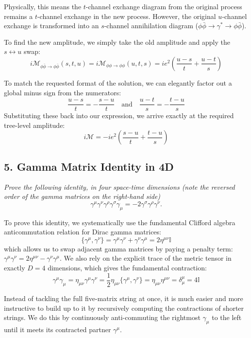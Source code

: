 Physically, this means the $t$-channel exchange diagram from the original process remains a $t$-channel exchange in the new process. However, the original $u$-channel exchange is transformed into an $s$-channel annihilation diagram ($\phi \bar{\phi} \to \gamma^* \to \phi \bar{\phi}$).

To find the new amplitude, we simply take the old amplitude and apply the $s \leftrightarrow u$ swap:
\[
    i\mathcal{M}_{\phi\bar{\phi} \to \phi\bar{\phi}}(s, t, u) = i\mathcal{M}_{\phi\phi \to \phi\phi}(u, t, s) = ie^2 \left( \frac{u - s}{t} + \frac{u - t}{s} \right)
\]

To match the requested format of the solution, we can elegantly factor out a global minus sign from the numerators:
\[
    \frac{u - s}{t} = -\frac{s - u}{t} \quad \text{and} \quad \frac{u - t}{s} = -\frac{t - u}{s}
\]
Substituting these back into our expression, we arrive exactly at the required tree-level amplitude:
\[
    i\mathcal{M} = -ie^2 \left( \frac{s - u}{t} + \frac{t - u}{s} \right)
\]


\subsection*{5. Gamma Matrix Identity in 4D}

\begin{center}
    \textit{Prove the following identity, in four space-time dimensions (note the reversed order of the gamma matrices on the right-hand side)}
    \[
        \gamma^\mu \gamma^\nu \gamma^\rho \gamma^\sigma \gamma_\mu = -2 \gamma^\sigma \gamma^\rho \gamma^\nu.
    \]
\end{center}

To prove this identity, we systematically use the fundamental Clifford algebra anticommutation relation for Dirac gamma matrices:
\[
    \{ \gamma^\mu, \gamma^\nu \} = \gamma^\mu \gamma^\nu + \gamma^\nu \gamma^\mu = 2\eta^{\mu\nu}\mathbb{I}
\]
which allows us to swap adjacent gamma matrices by paying a penalty term: $\gamma^\mu \gamma^\nu = 2\eta^{\mu\nu} - \gamma^\nu \gamma^\mu$. We also rely on the explicit trace of the metric tensor in exactly $D=4$ dimensions, which gives the fundamental contraction:
\[
    \gamma^\mu \gamma_\mu = \eta_{\mu\nu} \gamma^\mu \gamma^\nu = \frac{1}{2} \eta_{\mu\nu} \{ \gamma^\mu, \gamma^\nu \} = \eta_{\mu\nu} \eta^{\mu\nu} = \delta^\mu_\mu = 4\mathbb{I}
\]

Instead of tackling the full five-matrix string at once, it is much easier and more instructive to build up to it by recursively computing the contractions of shorter strings. We do this by continuously anti-commuting the rightmost $\gamma_\mu$ to the left until it meets its contracted partner $\gamma^\mu$.

